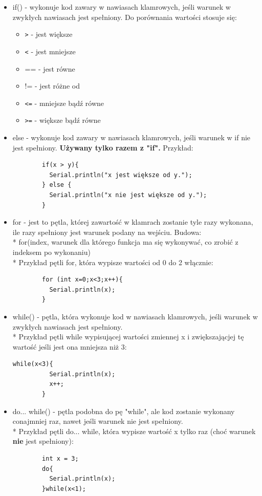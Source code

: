 	\begin{itemize}
		\item if(){} - wykonuje kod zawary w nawiasach klamrowych, jeśli warunek w zwykłych nawiasach jest spełniony. Do porównania wartości stosuje się:
			\begin{itemize}
				\item \verb|>| - jest większe
				\item \verb|<|  - jest mniejsze
				\item == - jest równe
				\item != - jest różne od
				\item \verb|<=| - mniejsze bądź równe
				\item \verb|>=| - większe bądź równe
			\end{itemize}
		\item else - wykonuje kod zawary w nawiasach klamrowych, jeśli warunek w if nie jest spełniony. \textbf{Używany tylko razem z "if".} Przykład:
		\begin{verbatim}
		if(x > y){
		  Serial.println("x jest większe od y.");
		} else {
		  Serial.println("x nie jest większe od y.");
		}
		\end{verbatim}
		\item for - jest to pętla, której zawartość w klamrach zostanie tyle razy wykonana, ile razy spełniony jest warunek podany na wejściu. Budowa:\\*
		for(index, warunek dla którego funkcja ma się wykonywać, co zrobić z indeksem po wykonaniu){}\\*
		Przykład pętli for, która wypisze wartości od 0 do 2 włącznie:
		\begin{verbatim}
		for (int x=0;x<3;x++){
		  Serial.println(x);
		}
		\end{verbatim}
		\item while() - pętla, która wykonuje kod w nawiasach klamrowych, jeśli warunek w zwykłych nawiasach jest spełniony.\\*
		Przykład pętli while wypisującej wartości zmiennej x i zwiększającjej tę wartość jeśli jest ona mniejsza niż 3:
		\begin{verbatim}while(x<3){
		  Serial.println(x);
		  x++;
		}
		\end{verbatim}
		\item do... while() - pętla podobna do pę "while", ale kod zostanie wykonany conajmniej raz, nawet jeśli warunek nie jest spełniony. \\*
		Przykład pętli do... while, która wypisze wartość x tylko raz (choć warunek \textbf{nie} jest spełniony):
		\begin {verbatim}
		int x = 3;
		do{
		  Serial.println(x);
		}while(x<1);
		\end{verbatim}
		
	\end{itemize}
